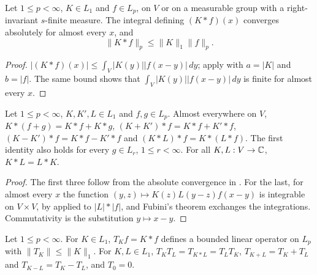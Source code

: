 \begin{theorem}
\label{thm:young}
\leanok
{}
Let $1 \leq p < \infty$, $K \in L_1$ and $f \in L_p$, on $V$ or on a measurable group with a
right-invariant $s$-finite measure. The integral defining $(K * f)(x)$ converges absolutely for
almost every $x$, and
\[
  \|K * f\|_p \leq \|K\|_1 \|f\|_p .
\]
\end{theorem}

\begin{proof}
\leanok
$|(K * f)(x)| \leq \int_V |K(y)| |f(x - y)| \, dy$; apply  with
$a = |K|$ and $b = |f|$. The same bound shows that $\int_V |K(y)| |f(x - y)| \, dy$ is finite
for almost every $x$.
\end{proof}

\begin{lemma}
\label{lem:conv-assoc}
\leanok
{}
Let $1 \leq p < \infty$, $K, K', L \in L_1$ and $f, g \in L_p$. Almost everywhere on $V$,
$K * (f + g) = K * f + K * g$, $(K + K') * f = K * f + K' * f$,
$(K - K') * f = K * f - K' * f$ and $(K * L) * f = K * (L * f)$. The first identity also holds
for every $g \in L_r$, $1 \leq r < \infty$. For all $K, L : V \to \mathbb{C}$, $K * L = L * K$.
\end{lemma}

\begin{proof}
\leanok
The first three follow from the absolute convergence in . For the last, for
almost every $x$ the function $(y, z) \mapsto K(z) L(y - z) f(x - y)$ is integrable on
$V \times V$, by  applied to $|L| * |f|$, and Fubini's theorem exchanges the
integrations. Commutativity is the substitution $y \mapsto x - y$.
\end{proof}

\begin{lemma}
\label{lem:conv-op}
\leanok
{}
Let $1 \leq p < \infty$. For $K \in L_1$, $T_K f = K * f$ defines a bounded linear operator on
$L_p$ with $\|T_K\| \leq \|K\|_1$. For $K, L \in L_1$, $T_K T_L = T_{K * L} = T_L T_K$,
$T_{K + L} = T_K + T_L$ and $T_{K - L} = T_K - T_L$, and $T_0 = 0$.
\end{lemma}

